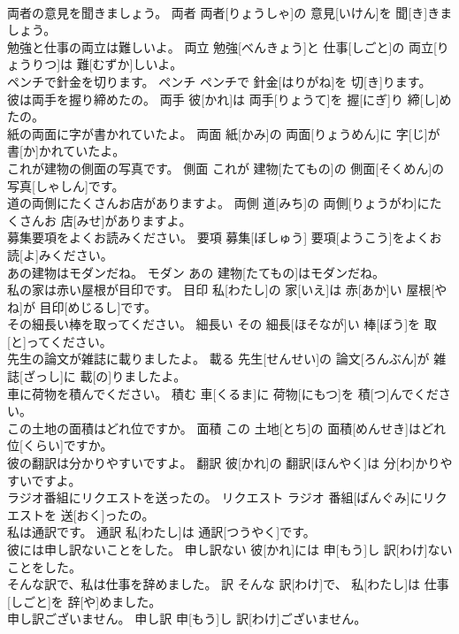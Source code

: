 \documentclass[8pt]{extreport}
\begin{document}
\begin{CJK}{UTF8}{min}
\\	両者の意見を聞きましょう。	両者	両者[りょうしゃ]の 意見[いけん]を 聞[き]きましょう。	
\\	勉強と仕事の両立は難しいよ。	両立	勉強[べんきょう]と 仕事[しごと]の 両立[りょうりつ]は 難[むずか]しいよ。	
\\	ペンチで針金を切ります。	ペンチ	ペンチで 針金[はりがね]を 切[き]ります。	
\\	彼は両手を握り締めたの。	両手	彼[かれ]は 両手[りょうて]を 握[にぎ]り 締[し]めたの。	
\\	紙の両面に字が書かれていたよ。	両面	紙[かみ]の 両面[りょうめん]に 字[じ]が 書[か]かれていたよ。	
\\	これが建物の側面の写真です。	側面	これが 建物[たてもの]の 側面[そくめん]の 写真[しゃしん]です。	
\\	道の両側にたくさんお店がありますよ。	両側	道[みち]の 両側[りょうがわ]にたくさんお 店[みせ]がありますよ。	
\\	募集要項をよくお読みください。	要項	募集[ぼしゅう] 要項[ようこう]をよくお 読[よ]みください。	
\\	あの建物はモダンだね。	モダン	あの 建物[たてもの]はモダンだね。	
\\	私の家は赤い屋根が目印です。	目印	私[わたし]の 家[いえ]は 赤[あか]い 屋根[やね]が 目印[めじるし]です。	
\\	その細長い棒を取ってください。	細長い	その 細長[ほそなが]い 棒[ぼう]を 取[と]ってください。	
\\	先生の論文が雑誌に載りましたよ。	載る	先生[せんせい]の 論文[ろんぶん]が 雑誌[ざっし]に 載[の]りましたよ。	
\\	車に荷物を積んでください。	積む	車[くるま]に 荷物[にもつ]を 積[つ]んでください。	
\\	この土地の面積はどれ位ですか。	面積	この 土地[とち]の 面積[めんせき]はどれ 位[くらい]ですか。	
\\	彼の翻訳は分かりやすいですよ。	翻訳	彼[かれ]の 翻訳[ほんやく]は 分[わ]かりやすいですよ。	
\\	ラジオ番組にリクエストを送ったの。	リクエスト	ラジオ 番組[ばんぐみ]にリクエストを 送[おく]ったの。	
\\	私は通訳です。	通訳	私[わたし]は 通訳[つうやく]です。	
\\	彼には申し訳ないことをした。	申し訳ない	彼[かれ]には 申[もう]し 訳[わけ]ないことをした。	
\\	そんな訳で、私は仕事を辞めました。	訳	そんな 訳[わけ]で、 私[わたし]は 仕事[しごと]を 辞[や]めました。	
\\	申し訳ございません。	申し訳	申[もう]し 訳[わけ]ございません。	

\end{CJK}
\end{document}
